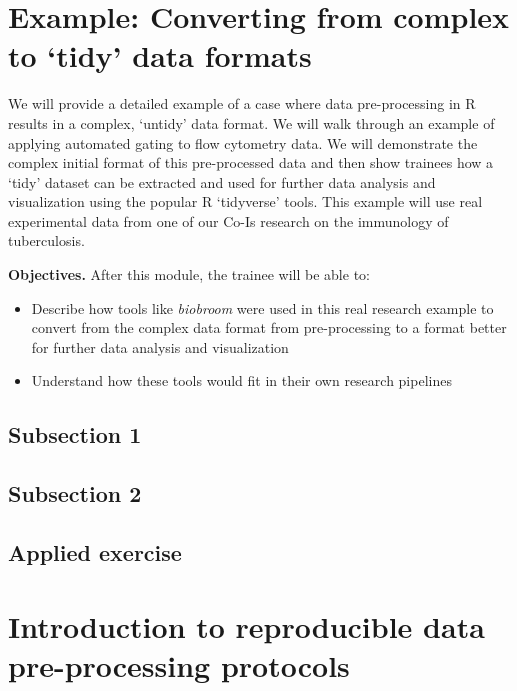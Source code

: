 \documentclass[]{tufte-book}
\providecommand{\tightlist}{%
  \setlength{\itemsep}{0pt}\setlength{\parskip}{0pt}}
\begin{document}
\hypertarget{example-converting-from-complex-to-tidy-data-formats}{%
\section{Example: Converting from complex to `tidy' data formats}\label{example-converting-from-complex-to-tidy-data-formats}}

We will provide a detailed example of a case where data pre-processing in R
results in a complex, `untidy' data format. We will walk through an example of
applying automated gating to flow cytometry data. We will demonstrate the
complex initial format of this pre-processed data and then show trainees how a
`tidy' dataset can be extracted and used for further data analysis and
visualization using the popular R `tidyverse' tools. This example will use real
experimental data from one of our Co-Is research on the immunology of
tuberculosis.

\textbf{Objectives.} After this module, the trainee will be able to:

\begin{itemize}
\tightlist
\item
  Describe how tools like \textit{biobroom} were used in this real research
  example to convert from the complex data format from pre-processing to a format
  better for further data analysis and visualization
\item
  Understand how these tools would fit in their own research pipelines
\end{itemize}

\hypertarget{subsection-1-12}{%
\subsection{Subsection 1}\label{subsection-1-12}}

\hypertarget{subsection-2-11}{%
\subsection{Subsection 2}\label{subsection-2-11}}

\hypertarget{applied-exercise-6}{%
\subsection{Applied exercise}\label{applied-exercise-6}}

\hypertarget{introduction-to-reproducible-data-pre-processing-protocols}{%
\section{Introduction to reproducible data pre-processing protocols}\label{introduction-to-reproducible-data-pre-processing-protocols}}
\end{document}
